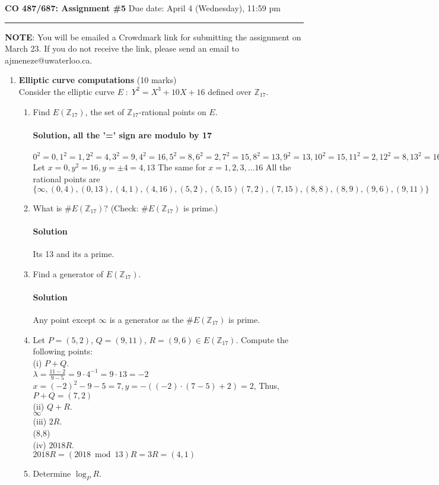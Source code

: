 \documentclass[11pt]{article}
\newcommand{\ZZ}{{\mathbb Z}}
\begin{document}
\noindent
{\large\bf CO 487/687: Assignment \#5} \hfill Due date: April 4 (Wednesday),
11:59 pm

\hfill\hrule

\vspace*{2mm}
\noindent
{\bf NOTE}: You will be emailed a Crowdmark link for submitting the
assignment on March 23. If you do not receive the link, please
send an email to ajmeneze@uwaterloo.ca.

\begin{enumerate}

\item {\bf Elliptic curve computations} (10 marks)\\
Consider the elliptic curve $E \; : \; Y^2 = X^3 + 10X + 16$ defined over
$\ZZ_{17}$.
\begin{enumerate}
\item Find $E(\ZZ_{17})$, the set of $\ZZ_{17}$-rational points on $E$.
\paragraph{Solution, all the '=' sign are modulo by 17}
$0^2=0, 1^2=1, 2^2=4, 3^2=9,4^2=16,5^2=8, 6^2=2, 7^2=15,8^2=13,9^2=13,10^2=15,11^2=2, 12^2=8, 13^2=16, 14^2=9, 15^2=4, 16^2=1$\\
Let $x=0, y^2= 16, y=\pm 4=4, 13$ The same for $x=1,2,3,\dots 16$
All the rational points are $\{ \infty, (0,4),(0,13),(4,1),(4,16),(5,2),(5,15) (7,2),(7,15),(8,8),(8,9),(9,6),(9,11) \}$
\item What is $\# E(\ZZ_{17})$? (Check: $\# E(\ZZ_{17})$ is prime.)
\paragraph{Solution} Its 13 and its a prime.
\item Find a generator of $E(\ZZ_{17})$.
\paragraph{Solution}
Any point except $\infty$ is a generator as the $\# E(\ZZ_{17})$ is prime.



\item Let $P = (5,2)$, $Q=(9,11)$, $R=(9,6) \in E(\ZZ_{17})$.
      Compute the following points:\\
      (i) $P+Q$.~~~ \\
      $\lambda = \frac{11-2}{9-5}=9\cdot 4^{-1}=9\cdot 13 = -2$\\
      $x=(-2)^2 - 9-5=7, y=-((-2)\cdot (7-5)+2) = 2$, Thus, $P+Q=
      (7,2)$\\
      (ii) $Q+R$.~~~ \\
      $\infty$\\
      (iii) $2R$.~~~ \\
      (8,8)\\
      (iv) $2018R$. \\
      $2018R= (2018 \bmod 13)R=3R=(4,1)$\\
\item Determine $\log_P R$.

\end{enumerate}
\end{enumerate}
\end{document}

